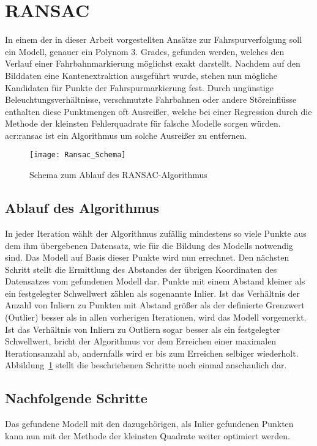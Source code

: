 \section{RANSAC \dcsecondauthorshort}
In einem der in dieser Arbeit vorgestellten Ansätze zur Fahrspurverfolgung soll ein Modell, genauer ein Polynom 3. Grades, gefunden werden, welches den Verlauf einer Fahrbahnmarkierung möglichst exakt darstellt. Nachdem auf den Bilddaten eine Kantenextraktion ausgeführt wurde, stehen nun mögliche Kandidaten für Punkte der Fahrspurmarkierung fest. Durch ungünstige Beleuchtungsverhältnisse, verschmutzte Fahrbahnen oder andere Störeinflüsse enthalten diese Punktmengen oft Ausreißer, welche bei einer Regression durch die Methode der kleinsten Fehlerquadrate für falsche Modelle sorgen würden. \gls{acr:ransac} \autocite{fischler1981random} ist ein Algorithmus um solche Ausreißer zu entfernen.

\begin{figure}[htbp]
  \centering
  \texttt{[image: Ransac\_Schema]}
  \caption{Schema zum Ablauf des RANSAC-Algorithmus}
  \label{fig:ransac_scheme}
\end{figure}

\subsection{Ablauf des Algorithmus} \label{ssec:grunglagen:ransac:ablauf}
In jeder Iteration wählt der Algorithmus zufällig mindestens so viele Punkte aus dem ihm übergebenen Datensatz, wie für die Bildung des Modells notwendig sind. Das Modell auf Basis dieser Punkte wird nun errechnet. Den nächsten Schritt stellt die Ermittlung des Abstandes der übrigen Koordinaten des Datensatzes vom gefundenen Modell dar. Punkte mit einem Abstand kleiner als ein festgelegter Schwellwert zählen als sogenannte Inlier. Ist das Verhältnis der Anzahl von Inliern zu Punkten mit Abstand größer als der definierte Grenzwert (Outlier) besser als in allen vorherigen Iterationen, wird das Modell vorgemerkt. Ist das Verhältnis von Inliern zu Outliern sogar besser als ein festgelegter Schwellwert, bricht der Algorithmus vor dem Erreichen einer maximalen Iterationsanzahl ab, andernfalls wird er bis zum Erreichen selbiger wiederholt. Abbildung~\ref{fig:ransac_scheme} stellt die beschriebenen Schritte noch einmal anschaulich dar.

\subsection{Nachfolgende Schritte}
Das gefundene Modell mit den dazugehörigen, als Inlier gefundenen Punkten kann nun mit der Methode der kleinsten Quadrate weiter optimiert werden.




